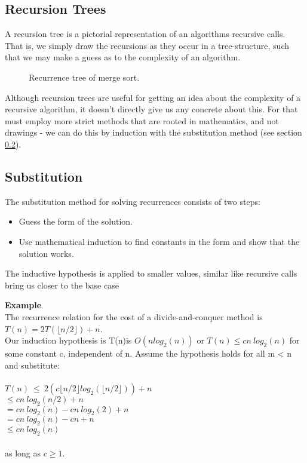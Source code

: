 \subsection{Recursion Trees}
A recursion tree is a pictorial representation of an algorithms recursive
calls. That is, we simply draw the recursions as they occur in a
tree-structure, such that we may make a guess as to the complexity of an
algorithm.

\begin{figure}[h]
	\caption{Recurrence tree of merge sort.}
\end{figure}

Although recursion trees are useful for getting an idea about the complexity
of a recursive algorithm, it doesn't directly give us any concrete about this.
For that must employ more strict methods that are rooted in mathematics, and
not drawings - we can do this by induction with the substitution method (see
section \ref{ch:divideandconquer|sub:recurrences|subsub:substitution}).
\clearpage
\subsection{Substitution}
\label{ch:divideandconquer|sub:recurrences|subsub:substitution}
The substitution method for solving recurrences consists of
two steps:\\
\begin{itemize}
\item Guess the form of the solution.
\item Use mathematical induction to find constants in the form and show that the solution works.
\end{itemize}
The inductive hypothesis is applied to smaller values,
similar like recursive calls bring us closer to the base case

 \textbf{Example}\\
 The recurrence relation for the cost of a divide-and-conquer
method is \\
$T(n) = 2T( \lfloor n/2 \rfloor ) + n$.\\
Our induction hypothesis is T(n)is $O(nlog_2 (n))$
or $T(n) \leq cn \ log_2 (n)$ for some constant c, independent of n.
Assume the hypothesis holds for all m < n and substitute: \\
\\
$ T(n)\ \leq \ 2(c \lfloor n/2 \rfloor log_2 (\lfloor n/2 \rfloor )) + n $ \\
$ \leq cn\ log_2(n/2)+n $ \\
$ = cn \ log_2(n) - cn \ log_2(2)+n $ \\
$ = cn \ log_2(n) - cn + n $ \\
$ \leq cn \ log_2 (n) $ \\
\\
as long as $ c \geq 1 $.




